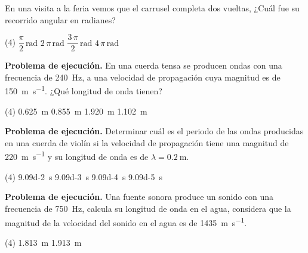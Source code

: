 \documentclass[12pt, letter]{exam}
\begin{document}
\begin{questions}
{}

     \question En una visita a la feria vemos que el carrusel completa dos vueltas, ¿Cuál fue su recorrido angular en radianes?
     \begin{tasks}(4)
         \task $\dfrac{\pi}{2} \, \unit{\radian}$
         \task $2 \, \pi \, \unit{\radian}$
         \task $\dfrac{3 \, \pi}{2} \, \unit{\radian}$
         \task $4 \, \pi \, \unit{\radian}$
     \end{tasks}
     \question \textbf{Problema de ejecución.} En una cuerda tensa se producen ondas con una frecuencia de \SI{240}{\hertz}, a una velocidad de propagación cuya magnitud es de \SI{150}{\meter\per\second}. ¿Qué longitud de onda tienen?
     \begin{tasks}(4)
        \task \SI{0.625}{\meter}
        \task \SI{0.855}{\meter}
        \task \SI{1.920}{\meter}
        \task \SI{1.102}{\meter}
    \end{tasks}
     \question \textbf{Problema de ejecución.} Determinar cuál es el periodo de las ondas producidas en una cuerda de violín si la velocidad de propagación tiene una magnitud de \SI{220}{\meter\per\second} y su longitud de onda es de $\lambda = \SI{0.2}{\meter}$.
     \begin{tasks}(4)
        \task \SI{9.09d-2}{\second}
        \task \SI{9.09d-3}{\second}
        \task \SI{9.09d-4}{\second}
        \task \SI{9.09d-5}{\second}
     \end{tasks}
     \question \textbf{Problema de ejecución.} Una fuente sonora produce un sonido con una frecuencia de \SI{750}{\hertz}, calcula su longitud de onda en el agua, considera que la magnitud de la velocidad del sonido en el agua es de \SI{1435}{\meter\per\second}.
     \begin{tasks}(4)
        \task \SI{1.813}{\meter}
        \task \SI{1.913}{\meter}

\end{tasks}
\end{questions}
\end{document}
